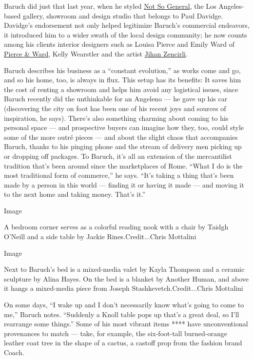 Baruch did just that last year, when he styled
\href{https://notsogeneral.la/}{Not So General}, the Los Angeles-based
gallery, showroom and design studio that belongs to Paul Davidge.
Davidge's endorsement not only helped legitimize Baruch's commercial
endeavors, it introduced him to a wider swath of the local design
community; he now counts among his clients interior designers such as
Louisa Pierce and Emily Ward of \href{https://pierceandward.com/}{Pierce
\& Ward}, Kelly Wearstler and the artist
\href{https://www.nytimes.com/2018/07/19/arts/design/geronimo-pier-17-south-street-seaport.html}{Jihan
Zencirli}.

Baruch describes his business as a ``constant evolution,'' as works come
and go, and so his home, too, is always in flux. This setup has its
benefits: It saves him the cost of renting a showroom and helps him
avoid any logistical issues, since Baruch recently did the unthinkable
for an Angeleno --- he gave up his car (discovering the city on foot has
been one of his recent joys and sources of inspiration, he says).
There's also something charming about coming to his personal space ---
and prospective buyers can imagine how they, too, could style some of
the more outré pieces --- and about the slight chaos that accompanies
Baruch, thanks to his pinging phone and the stream of delivery men
picking up or dropping off packages. To Baruch, it's all an extension of
the mercantilist tradition that's been around since the marketplaces of
Rome. ``What I do is the most traditional form of commerce,'' he says.
``It's taking a thing that's been made by a person in this world ---
finding it or having it made --- and moving it to the next home and
taking money. That's it.''

Image

A bedroom corner serves as a colorful reading nook with a chair by
Taidgh O'Neill and a side table by Jackie Rines.Credit...Chris Mottalini

Image

Next to Baruch's bed is a mixed-media valet by Kayla Thompson and a
ceramic sculpture by Alina Hayes. On the bed is a blanket by Another
Human, and above it hangs a mixed-media piece from Joseph
Stashkevetch.Credit...Chris Mottalini

On some days, ``I wake up and I don't necessarily know what's going to
come to me,'' Baruch notes. ``Suddenly a Knoll table pops up that's a
great deal, so I'll rearrange some things.'' Some of his most vibrant
items **** have unconventional provenances to match --- take, for
example, the six-foot-tall burned-orange leather coat tree in the shape
of a cactus, a castoff prop from the fashion brand Coach.

